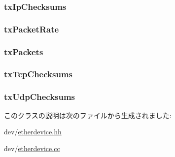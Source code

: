 \label{classEtherDevice_abbcbcdf8c27d517363ead6a7f6d26e0d}
\hypertarget{classEtherDevice_ab8fd14604893c8e4a3972f2fdf9501e1}{
\subsubsection[{txIpChecksums}]{ {\bf txIpChecksums}}}
\label{classEtherDevice_ab8fd14604893c8e4a3972f2fdf9501e1}
\hypertarget{classEtherDevice_ad2a16b3e606ae3ab1afdf0072bb2040f}{
\subsubsection[{txPacketRate}]{ {\bf txPacketRate}}}
\label{classEtherDevice_ad2a16b3e606ae3ab1afdf0072bb2040f}
\hypertarget{classEtherDevice_a954bf8127dea683de5f15cb0e2103657}{
\subsubsection[{txPackets}]{ {\bf txPackets}}}
\label{classEtherDevice_a954bf8127dea683de5f15cb0e2103657}
\hypertarget{classEtherDevice_a5eb11fbceeba64f33c20a6f83d47fa4c}{
\subsubsection[{txTcpChecksums}]{ {\bf txTcpChecksums}}}
\label{classEtherDevice_a5eb11fbceeba64f33c20a6f83d47fa4c}
\hypertarget{classEtherDevice_aa1217365fc3caee57fb3a21d3a51b237}{
\subsubsection[{txUdpChecksums}]{ {\bf txUdpChecksums}}}
\label{classEtherDevice_aa1217365fc3caee57fb3a21d3a51b237}


このクラスの説明は次のファイルから生成されました:\begin{DoxyCompactItemize}
\item 
dev/\hyperlink{etherdevice_8hh}{etherdevice.hh}\item 
dev/\hyperlink{etherdevice_8cc}{etherdevice.cc}\end{DoxyCompactItemize}
